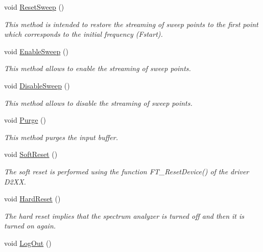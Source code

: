 \begin{DoxyCompactItemize}
void \hyperlink{classSpectranInterface_a512218c4f1589c32b4fd9a0f7ad5e8cc}{Reset\+Sweep} ()
\begin{DoxyCompactList}\small\item\em This method is intended to restore the streaming of sweep points to the first point which corresponds to the initial frequency (Fstart). \end{DoxyCompactList}\item 
void \hyperlink{classSpectranInterface_ac812a1bcaede6504f62cc544c30fffea}{Enable\+Sweep} ()
\begin{DoxyCompactList}\small\item\em This method allows to enable the streaming of sweep points. \end{DoxyCompactList}\item 
void \hyperlink{classSpectranInterface_a68b1b1a6af802369cb146c69161d031d}{Disable\+Sweep} ()
\begin{DoxyCompactList}\small\item\em This method allows to disable the streaming of sweep points. \end{DoxyCompactList}\item 
\mbox{\label{classSpectranInterface_a67de35ac5416ab4e7880ee03fcd2884e}} 
void \hyperlink{classSpectranInterface_a67de35ac5416ab4e7880ee03fcd2884e}{Purge} ()
\begin{DoxyCompactList}\small\item\em This method purges the input buffer. \end{DoxyCompactList}\item 
void \hyperlink{classSpectranInterface_a59eff163ecf77f55bba22f49ef79d909}{Soft\+Reset} ()
\begin{DoxyCompactList}\small\item\em The soft reset is performed using the function {\ttfamily F\+T\+\_\+\+Reset\+Device()} of the driver D2\+XX. \end{DoxyCompactList}\item 
void \hyperlink{classSpectranInterface_a44ee786fb582c5db42253ec0c96f3b8e}{Hard\+Reset} ()
\begin{DoxyCompactList}\small\item\em The hard reset implies that the spectrum analyzer is turned off and then it is turned on again. \end{DoxyCompactList}\item 
void \hyperlink{classSpectranInterface_a8884f03d3075589a2850c83c9fd57e72}{Log\+Out} ()

\end{DoxyCompactItemize}
